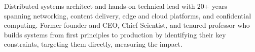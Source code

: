 \noindent
Distributed systems architect and hands-on technical lead with 20+ years
spanning networking, content delivery, edge and cloud platforms, and
confidential computing.
Former founder and CEO, Chief Scientist, and tenured professor who builds
systems from first principles to production by identifying their key
constraints, targeting them directly, measuring the impact.







%
%

